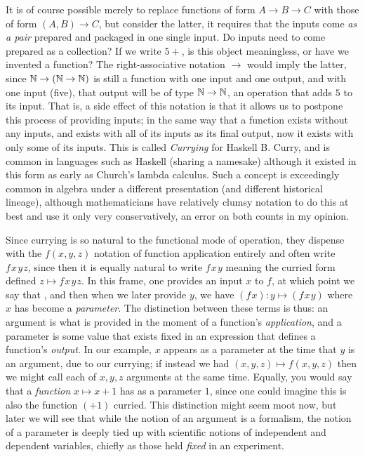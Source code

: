 \documentclass[11pt]{article}
\begin{document}
It is of course possible merely to replace functions of form $A \to B \to C$ with those of form $(A,B) \to C$, but consider the latter, it requires that the inputs come \emph{as a pair} prepared and packaged in one single input. Do inputs need to come prepared as a collection? If we write $5+$, is this object meaningless, or have we invented a function? The right-associative notation $\to$ would imply the latter, since $\mathbb{N} \to (\mathbb{N} \to \mathbb{N})$ is still a function with one input and one output, and with one input (five), that output will be of type $\mathbb{N} \to \mathbb{N}$, an operation that adds $5$ to its input. That is, a side effect of this notation is that it allows us to postpone this process of providing inputs; in the same way that a function exists without any inputs, and exists with all of its inputs as its final output, now it exists with only some of its inputs. This is called \emph{Currying} for Haskell B. Curry, and is common in languages such as Haskell (sharing a namesake) although it existed in this form as early as Church's lambda calculus. Such a concept is exceedingly common in algebra under a different presentation (and different historical lineage), although mathematicians have relatively clumsy notation to do this at best and use it only very conservatively, an error on both counts in my opinion.

Since currying is so natural to the functional mode of operation, they dispense with the $f(x,y,z)$ notation of function application entirely and often write $f \hspace{1pt} x \hspace{1pt} y \hspace{1pt} z$, since then it is equally natural to write $f \hspace{1pt} x \hspace{1pt} y$ meaning the curried form defined $z \mapsto f \hspace{1pt} x \hspace{1pt} y \hspace{1pt} z$. In this frame, one provides an input $x$ to $f$, at which point we say that , and then when we later provide $y$, we have $(f \hspace{1pt} x) \colon y \mapsto (f \hspace{1pt} x \hspace{1pt} y)$ where $x$ has become a \emph{parameter}. The distinction between these terms is thus: an argument is what is provided in the moment of a function's \emph{application}, and a parameter is some value that exists fixed in an expression that defines a function's \emph{output}. In our example, $x$ appears as a parameter at the time that $y$ is an argument, due to our currying; if instead we had $(x,y,z) \mapsto f(x,y,z)$ then we might call each of $x,y,z$ arguments at the same time. Equally, you would say that a \emph{function} $x \mapsto x + 1$ has as a parameter $1$, since one could imagine this is also the function $(+1)$ curried. This distinction might seem moot now, but later we will see that while the notion of an argument is a formalism, the notion of a parameter is deeply tied up with scientific notions of independent and dependent variables, chiefly as those held \emph{fixed} in an experiment.
\end{document}
